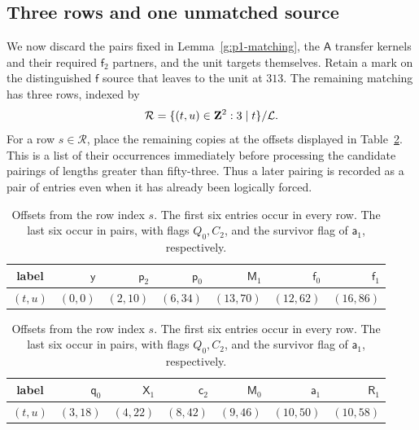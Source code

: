 \subsection{Three rows and one unmatched source}

We now discard the pairs fixed in Lemma~\ref{g:p1-matching},
the $\mathsf A$ transfer kernels and their required
$\mathsf f_2$ partners, and the unit targets themselves.
Retain a mark on the distinguished $\mathsf f$ source
that leaves to the unit at $313$.  The remaining
matching has three rows, indexed by
\[
 \mathcal R=\{(t,u)\in\mathbf Z^2:3\mid t\}/\mathcal L.
\]
For a row $s\in\mathcal R$, place the remaining copies
at the offsets displayed in Table~\ref{g:row-offsets}.
This is a list of their occurrences immediately
before processing the candidate pairings of lengths
greater than fifty-three.  Thus a later pairing is
recorded as a pair of entries even when it has already
been logically forced.

\begin{table}[htbp]
\centering
\setlength{\tabcolsep}{5pt}
\begin{tabular}{c|rrrrrr}
\toprule
label&$\mathsf y$&$\mathsf p_2$&$\mathsf p_0$&
 $\mathsf M_1$&$\mathsf f_0$&$\mathsf f_1$\\\midrule
$(t,u)$&$(0,0)$&$(2,10)$&$(6,34)$&
 $(13,70)$&$(12,62)$&$(16,86)$\\\bottomrule
\end{tabular}

\medskip
\begin{tabular}{c|rrrrrr}
\toprule
label&$\mathsf q_0$&$\mathsf X_1$&$\mathsf c_2$&
 $\mathsf M_0$&$\mathsf a_1$&$\mathsf R_1$\\\midrule
$(t,u)$&$(3,18)$&$(4,22)$&$(8,42)$&
 $(9,46)$&$(10,50)$&$(10,58)$\\\bottomrule
\end{tabular}
\caption{Offsets from the row index $s$.  The first six
entries occur in every row.  The last six occur in
pairs, with flags $Q_0,C_2$, and the survivor flag of
$\mathsf a_1$, respectively.}\label{g:row-offsets}
\end{table}

